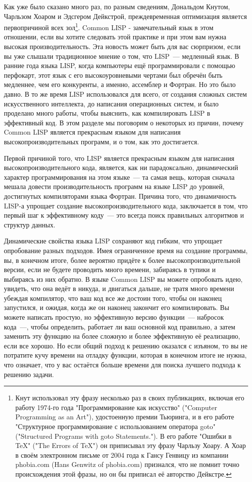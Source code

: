 Как уже было сказано много раз, по разным сведениям, Дональдом Кнутом, Чарльзом Хоаром и
Эдсгером Дейкстрой, преждевременная оптимизация является первопричиной всех
зол\footnote{Кнут использовал эту фразу несколько раз в своих публикациях, включая его
  работу 1974-го года "Программирование как искусство" ("Computer Programming as an Art"),
  удостоенную премии Тьюринга, и в его работе "Структурное программирование с
  использованием оператора goto" ("Structured Programs with goto Statements."). В его
  работе "Ошибки в TeX" ("The Errors of TeX") он приписывал эту фразу Чарльзу Хоару. А
  Хоар в своём электронном письме от 2004 года к Гансу Генвицу из компании phobia.com
  (Hans Genwitz of phobia.com) признался, что не помнит точно происхождения этой фразы, но
  он бы приписал её авторство Дейкстре.}. Common LISP - замечательный язык в этом
отношении, если вы хотите следовать этой практике и при этом вам нужна высокая
производительность. Эта новость может быть для вас сюрпризом, если вы уже слышали
традиционное мнение о том, что LISP~--- медленный язык. В ранние года языка LISP, когда
компьютеры ещё программировали с помощью перфокарт, этот язык с его высокоуровневыми
чертами был обречён быть медленнее, чем его конкуренты, а именно, ассемблер и Фортран. Но
это было давно. В то же время LISP использовался для всего, от создания сложных систем
искусственного интеллекта, до написания операционных систем, и было проделано много
работы, чтобы выяснить, как компилировать LISP в эффективный код.  В этом разделе мы
поговорим о некоторых из причин, почему Common LISP является прекрасным языком для
написания высокопроизводительных программ, и о том, как это достигается.

Первой причиной того, что LISP является прекрасным языком для написания
высокопроизводительного кода, является, как ни парадоксально, динамический характер
программирования на этом языке~--- та самая вещь, которая сначала мешала довести
производительность программ на языке LISP до уровней, достигнутых компиляторами языка
Фортран. Причина того, что динамичность LISP-а упрощает создание высокопроизводительного
кода, заключается в том, что первый шаг к эффективному коду~--- это всегда поиск
правильных алгоритмов и структур данных.

Динамические свойства языка LISP сохраняют код гибким, что упрощает опробование разных
подходов. Имея ограниченное время на создание программы, вы, в конечном итоге, более
вероятно придёте к более высокопроизводительной версии, если не будете проводить много
времени, забираясь в тупики и выбираясь из них обратно. В языке Common LISP вы можете
опробовать идею, увидеть, что она ведёт в никуда, и двигаться дальше, не тратя много
времени убеждая компилятор, что ваш код все же достоин того, чтобы он наконец запустился,
и ожидая, когда же он наконец закончит его компилировать. Вы можете написать простую, но
эффективную версию функции~--- набросок кода~---, чтобы определить, работает ли ваш
основной код правильно, а затем заменить эту функцию на более сложную и более эффективную
её реализацию, если все хорошо. Но если общий подход к решению оказался с изъяном, то вы
не потратите кучу времени на отладку функции, которая в конечном итоге не нужна, что
означает, что у вас остаётся больше времени для поиска лучшего подхода к решению задачи.

